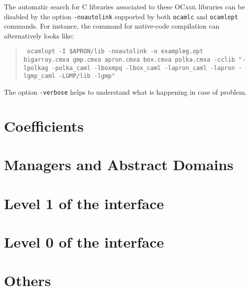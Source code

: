 \documentclass[twoside,10pt,a4paper]{report}
\begin{document}
The automatic search for C libraries associated to these
\textsc{OCaml} libraries can be disabled by the option
\texttt{-noautolink} supported by both \texttt{ocamlc} and
\texttt{ocamlopt} commands. For instance, the command for native-code compilation can alternatively looks like:
\begin{quote}\tt
  ocamlopt -I \$APRON/lib -noautolink -o exampleg.opt bigarray.cmxa gmp.cmxa apron.cmxa box.cmxa polka.cmxa -cclib "-lpolkag -polka\_caml -lboxmpq -lbox\_caml -lapron\_caml -lapron -lgmp\_caml -LGMP/lib -lgmp"
\end{quote}

The option \texttt{-verbose} helps to understand what is happening
in case of problem.

\part{Coefficients}






\part{Managers and Abstract Domains}





\part{Level 1 of the interface}








\part{Level 0 of the interface}






\part{Others}




\appendix
\printindex
\end{document}
